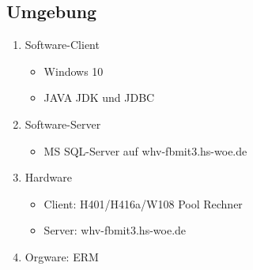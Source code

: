 \subsection{Umgebung}

\begin{enumerate}
  \item Software-Client
  \begin{itemize}
    \item Windows 10
    \item JAVA JDK und JDBC
  \end{itemize}
  \item Software-Server
  \begin{itemize}
    \item MS SQL-Server auf whv-fbmit3.hs-woe.de
  \end{itemize}
  \item Hardware \begin{itemize}
    \item Client: H401/H416a/W108 Pool Rechner
    \item Server: whv-fbmit3.hs-woe.de
  \end{itemize}
  \item Orgware: ERM
  \end{enumerate}




